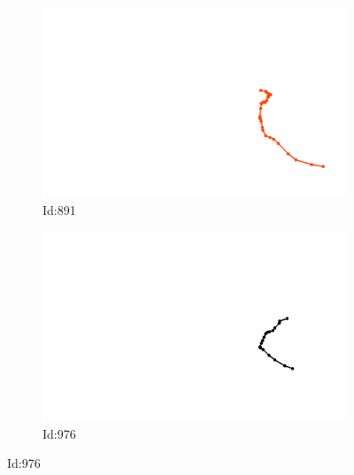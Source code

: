 \documentclass[12pt,twoside]{report}
\begin{document}
\begin{figure}
\begin{subfigure}[b]{0.20\textwidth}
\centering
\includegraphics[width=\textwidth]{../trajectories/891.png}
\caption{Id:891}
\end{subfigure}
\begin{subfigure}[b]{0.20\textwidth}
\centering
\includegraphics[width=\textwidth]{../trajectories/976.png}
\caption{Id:976}
\end{subfigure}
\end{figure}
\end{document}
